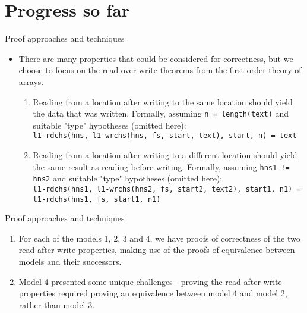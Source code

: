 \documentclass{beamer}
\begin{document}
\section{Progress so far}
\begin{frame}{Proof approaches and techniques}
  \begin{itemize}
  \item There are many properties that could be considered for
    correctness, but we choose to focus on the read-over-write
    theorems from the first-order theory of arrays.
    \begin {enumerate}
    \item Reading from a location after writing to the same location
      should yield the data that was written. Formally, assuming \texttt{n =
      length(text)} and suitable "type" hypotheses (omitted here): \\
      \texttt{l1-rdchs(hns, l1-wrchs(hns, fs, start, text), start, n)
      =
      text}
    \item Reading from a location after writing to a different
      location should yield the same result as reading before
      writing. Formally, assuming \texttt{hns1 != hns2} and suitable "type"
      hypotheses (omitted here):\\
      \texttt{l1-rdchs(hns1, l1-wrchs(hns2, fs, start2, text2), start1, n1)
        =
        l1-rdchs(hns1, fs, start1, n1)}
    \end {enumerate}
  \end{itemize}
\end{frame}

\begin{frame}{Proof approaches and techniques}
  \begin{enumerate}
  \item For each of the models 1, 2, 3 and 4, we have proofs of correctness of
    the two read-after-write properties, making use of the proofs of
    equivalence between models and their successors.
  \item Model 4 presented some unique challenges - proving the
    read-after-write properties required proving an equivalence
    between model 4 and model 2, rather than model 3.
  \end{enumerate}
\end{frame}
\end{document}

